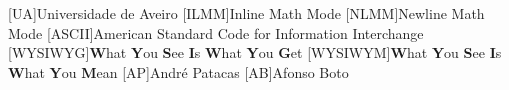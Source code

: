 [UA]{Universidade de Aveiro}
[ILMM]{Inline Math Mode}
[NLMM]{Newline Math Mode}
[ASCII]{American Standard Code for Information Interchange}
[WYSIWYG]{\textbf{W}hat \textbf{Y}ou \textbf{S}ee \textbf{I}s \textbf{W}hat \textbf{Y}ou \textbf{G}et}
[WYSIWYM]{\textbf{W}hat \textbf{Y}ou \textbf{S}ee \textbf{I}s \textbf{W}hat \textbf{Y}ou \textbf{M}ean}
[AP]{André Patacas}
[AB]{Afonso Boto}



